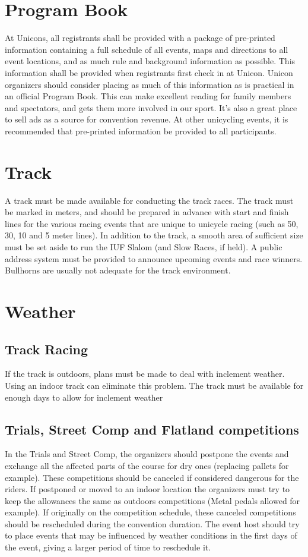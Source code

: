 \section{Program Book}
At Unicons, all registrants shall be provided with a package of pre-printed information containing a full schedule of all events, maps and directions to all event locations, and as much rule and background information as possible.
This information shall be provided when registrants first check in at Unicon.
Unicon organizers should consider placing as much of this information as is practical in an official Program Book.
This can make excellent reading for family members and spectators, and gets them more involved in our sport.
It's also a great place to sell ads as a source for convention revenue.
At other unicycling events, it is recommended that pre-printed information be provided to all participants.

\section{Track}
A track must be made available for conducting the track races.
The track must be marked in meters, and should be prepared in advance with start and finish lines for the various racing events that are unique to unicycle racing (such as 50, 30, 10 and 5 meter lines).
In addition to the track, a smooth area of sufficient size must be set aside to run the IUF Slalom (and Slow Races, if held).
A public address system must be provided to announce upcoming events and race winners.
Bullhorns are usually not adequate for the track environment.

\section{Weather}

\subsection{Track Racing}
If the track is outdoors, plans must be made to deal with inclement weather.
Using an indoor track can eliminate this problem.
The track must be available for enough days to allow for inclement weather 
\subsection{Trials, Street Comp and Flatland competitions}
In the Trials and Street Comp, the organizers should postpone the events and exchange all the affected parts of the course for dry ones (replacing pallets for example).
These competitions should be canceled if considered dangerous for the riders.
If postponed or moved to an indoor location the organizers must try to keep the allowances the same as outdoors competitions (Metal pedals allowed for example).
If originally on the competition schedule, these canceled competitions should be rescheduled during the convention duration.
The event host should try to place events that may be influenced by weather conditions in the first days of the event, giving a larger period of time to reschedule it.

